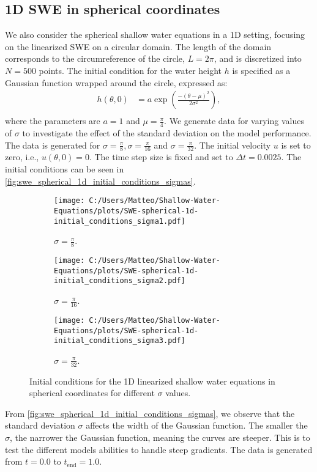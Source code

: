 \subsection*{1D SWE in spherical coordinates}
We also consider the spherical shallow water equations in a 1D setting, focusing on the linearized SWE on a circular domain.
The length of the domain corresponds to the circumreference of the circle, $L = 2\pi$, and is discretized into $N = 500$ points.
The initial condition for the water height $h$ is specified as a Gaussian function wrapped around the circle, expressed as:
\begin{align}\label{eq:1D_swe_spherical_ic}
    h(\theta, 0) &= a \exp \left( \frac{-{(\theta-\mu)}^2}{2 \sigma^2} \right) ,\\
\end{align}
where the parameters are $a = 1$ and $\mu = \frac{\pi}{4}$.
We generate data for varying values of $\sigma$ to investigate the effect of the standard deviation on the model performance.
The data is generated for $\sigma = \frac{\pi}{8}, \sigma = \frac{\pi}{16}$ and $\sigma = \frac{\pi}{32}$.
The initial velocity $u$ is set to zero, i.e., $u(\theta,0) = 0$.
The time step size is fixed and set to $\Delta t = 0.0025$.
The initial conditions can be seen in \autoref{fig:swe_spherical_1d_initial_conditions_sigmas}.
\begin{figure}[H]
    \centering
    \begin{subfigure}[b]{0.3\textwidth}
        \centering
        \texttt{[image: C:/Users/Matteo/Shallow-Water-Equations/plots/SWE-spherical-1d-initial\_conditions\_sigma1.pdf]}
        \caption{$\sigma = \frac{\pi}{8}$.}\label{fig:swe_spherical_1d_sigma1}
    \end{subfigure}
    \hfill
    \begin{subfigure}[b]{0.3\textwidth}
        \centering
        \texttt{[image: C:/Users/Matteo/Shallow-Water-Equations/plots/SWE-spherical-1d-initial\_conditions\_sigma2.pdf]}
        \caption{$\sigma = \frac{\pi}{16}$.}\label{fig:swe_spherical_1d_sigma2}
    \end{subfigure}
    \hfill
    \begin{subfigure}[b]{0.3\textwidth}
        \centering
        \texttt{[image: C:/Users/Matteo/Shallow-Water-Equations/plots/SWE-spherical-1d-initial\_conditions\_sigma3.pdf]}
        \caption{$\sigma = \frac{\pi}{32}$.}\label{fig:swe_spherical_1d_sigma3}
    \end{subfigure}
    \caption{Initial conditions for the 1D linearized shallow water equations in spherical coordinates for different \(\sigma\) values.}\label{fig:swe_spherical_1d_initial_conditions_sigmas}
\end{figure}
From \autoref{fig:swe_spherical_1d_initial_conditions_sigmas}, we observe that the standard deviation \(\sigma\) affects the width of the Gaussian function.
The smaller the $\sigma$, the narrower the Gaussian function, meaning the curves are steeper.
This is to test the different models abilities to handle steep gradients.
The data is generated from $t = 0.0$ to $t_{\text{end}} = 1.0$.

